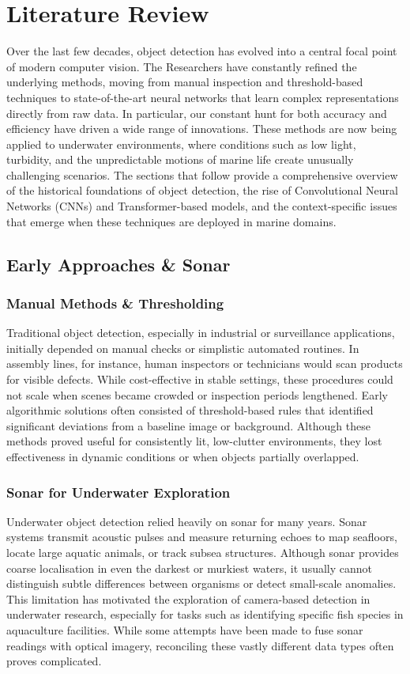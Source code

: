 \chapter{Literature Review}
Over the last few decades, object detection has evolved into a central focal point of modern computer vision. The Researchers have constantly refined the underlying methods, moving from manual inspection and threshold-based techniques to state-of-the-art neural networks that learn complex representations directly from raw data. In particular, our constant hunt for both accuracy and efficiency have driven a wide range of innovations. These methods are now being applied to underwater environments, where conditions such as low light, turbidity, and the unpredictable motions of marine life create unusually challenging scenarios. The sections that follow provide a comprehensive overview of the historical foundations of object detection, the rise of Convolutional Neural Networks (CNNs) and Transformer-based models, and the context-specific issues that emerge when these techniques are deployed in marine domains.
\section{Early Approaches \& Sonar}
\subsection{Manual Methods \& Thresholding}
Traditional object detection, especially in industrial or surveillance applications, initially depended on manual checks or simplistic automated routines. In assembly lines, for instance, human inspectors or technicians would scan products for visible defects. While cost-effective in stable settings, these procedures could not scale when scenes became crowded or inspection periods lengthened. Early algorithmic solutions often consisted of threshold-based rules that identified significant deviations from a baseline image or background. Although these methods proved useful for consistently lit, low-clutter environments, they lost effectiveness in dynamic conditions or when objects partially overlapped.

\subsection{Sonar for Underwater Exploration}
Underwater object detection relied heavily on sonar for many years. Sonar systems transmit acoustic pulses and measure returning echoes to map seafloors, locate large aquatic animals, or track subsea structures. Although sonar provides coarse localisation in even the darkest or murkiest waters, it usually cannot distinguish subtle differences between organisms or detect small-scale anomalies. This limitation has motivated the exploration of camera-based detection in underwater research, especially for tasks such as identifying specific fish species in aquaculture facilities. While some attempts have been made to fuse sonar readings with optical imagery, reconciling these vastly different data types often proves complicated.
